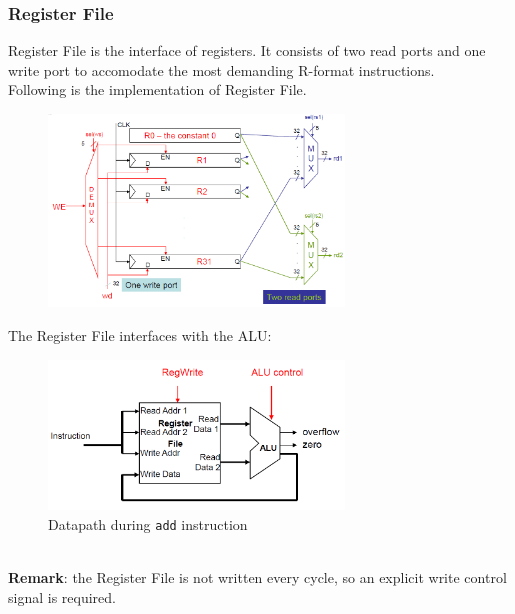 \documentclass[12pt]{article}
\theoremstyle{definition}
\begin{document}
\subsubsection{Register File}
Register File is the interface of registers. It consists of two read ports and one write port to accomodate the most demanding R-format instructions.\\
Following is the implementation of Register File.
\clearpage
\begin{figure}[h]
\centering
\includegraphics[width = 0.7\textwidth]{12_3.png}
\end{figure}
The Register File interfaces with the ALU:
\begin{figure}[h]
\centering
\includegraphics[width = 0.7\textwidth]{12_4.png}
\caption{Datapath during \texttt{add} instruction}
\end{figure}\\
\textbf{Remark}: the Register File is not written every cycle, so an explicit write control signal is required.
\end{document}
